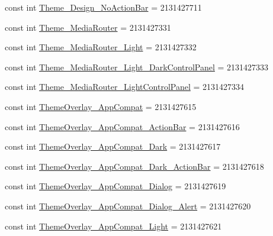\begin{DoxyCompactItemize}
\item 
const int \mbox{\hyperlink{class_f_w_p_s___app_1_1_droid_1_1_resource_1_1_style_a917f174343649e863d6c4af72693b131}{Theme\+\_\+\+Design\+\_\+\+No\+Action\+Bar}} = 2131427711
\item 
const int \mbox{\hyperlink{class_f_w_p_s___app_1_1_droid_1_1_resource_1_1_style_a6e9722a21f525f5c99673dd13aaf6a66}{Theme\+\_\+\+Media\+Router}} = 2131427331
\item 
const int \mbox{\hyperlink{class_f_w_p_s___app_1_1_droid_1_1_resource_1_1_style_aabfae3f298a9282221db0637b729aab6}{Theme\+\_\+\+Media\+Router\+\_\+\+Light}} = 2131427332
\item 
const int \mbox{\hyperlink{class_f_w_p_s___app_1_1_droid_1_1_resource_1_1_style_a5cee582ff9eb99012bc7267da624d5da}{Theme\+\_\+\+Media\+Router\+\_\+\+Light\+\_\+\+Dark\+Control\+Panel}} = 2131427333
\item 
const int \mbox{\hyperlink{class_f_w_p_s___app_1_1_droid_1_1_resource_1_1_style_a74e2655ca9417860f9cec4997a9f9770}{Theme\+\_\+\+Media\+Router\+\_\+\+Light\+Control\+Panel}} = 2131427334
\item 
const int \mbox{\hyperlink{class_f_w_p_s___app_1_1_droid_1_1_resource_1_1_style_a0658b3e761edc364228048968091c1ec}{Theme\+Overlay\+\_\+\+App\+Compat}} = 2131427615
\item 
const int \mbox{\hyperlink{class_f_w_p_s___app_1_1_droid_1_1_resource_1_1_style_af17578d523ce15e00ef622866604b97a}{Theme\+Overlay\+\_\+\+App\+Compat\+\_\+\+Action\+Bar}} = 2131427616
\item 
const int \mbox{\hyperlink{class_f_w_p_s___app_1_1_droid_1_1_resource_1_1_style_a34bdec911c7fb89da7ac75f9ad0d7157}{Theme\+Overlay\+\_\+\+App\+Compat\+\_\+\+Dark}} = 2131427617
\item 
const int \mbox{\hyperlink{class_f_w_p_s___app_1_1_droid_1_1_resource_1_1_style_a5c1f95d815918577f0af936f5f6c30a4}{Theme\+Overlay\+\_\+\+App\+Compat\+\_\+\+Dark\+\_\+\+Action\+Bar}} = 2131427618
\item 
const int \mbox{\hyperlink{class_f_w_p_s___app_1_1_droid_1_1_resource_1_1_style_af3a145a320d803761460ce48ab5c3d5d}{Theme\+Overlay\+\_\+\+App\+Compat\+\_\+\+Dialog}} = 2131427619
\item 
const int \mbox{\hyperlink{class_f_w_p_s___app_1_1_droid_1_1_resource_1_1_style_a4f50896b3a77c8cedeb054cce26def80}{Theme\+Overlay\+\_\+\+App\+Compat\+\_\+\+Dialog\+\_\+\+Alert}} = 2131427620
\item 
const int \mbox{\hyperlink{class_f_w_p_s___app_1_1_droid_1_1_resource_1_1_style_a576ddc8b3d6ec34a97a1f4d09c3c0358}{Theme\+Overlay\+\_\+\+App\+Compat\+\_\+\+Light}} = 2131427621

\end{DoxyCompactItemize}
